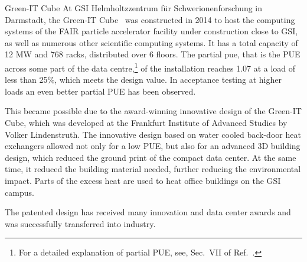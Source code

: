 \documentclass[../SustainableHEP.tex]{subfiles}
\begin{document}
\begin{bestpractice}{Green-IT Cube}%
\noindent At  GSI Helmholtzzentrum für Schwerionenforschung in Darmstadt, the Green-IT Cube~\cite{GreenITCube} was constructed in 2014 to host the computing systems of the FAIR particle accelerator facility under construction close to GSI, as well as numerous other scientific computing systems. It has a total capacity of 12 MW and 768 racks, distributed over 6 floors. The partial \acrshort{pue}, that is the PUE across some part of the data centre,\footnote{For a detailed explanation of partial PUE, see, \eg Sec.~VII of Ref.~\cite{GreenGridPUE}.} of the installation reaches 1.07 at a load of less than 25\%, which meets the design value. In acceptance testing at higher loads an even better partial PUE has been observed.
 
This became possible due to the award-winning innovative design of the Green-IT Cube, which was developed at the Frankfurt Institute of Advanced Studies by Volker Lindenstruth. The innovative design based on water cooled back-door heat exchangers allowed not only for a low PUE, but also for an advanced 3D building design, which reduced the ground print of the compact data center. At the same time, it reduced the building material needed, further reducing the environmental impact. Parts of the excess heat are used to heat office buildings on the GSI campus.
 
The patented design has received many innovation and data center awards and was successfully transferred into industry.
\end{bestpractice}

\end{document}
